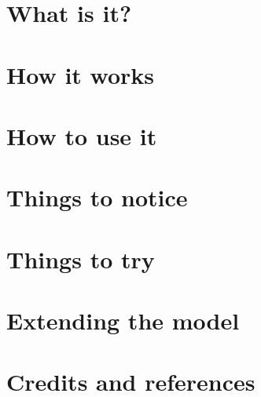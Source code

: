 
\section{What is it?}
\section{How it works}
\section{How to use it}
\section{Things to notice}
\section{Things to try}
\section{Extending the model}
\section{Credits and references}
